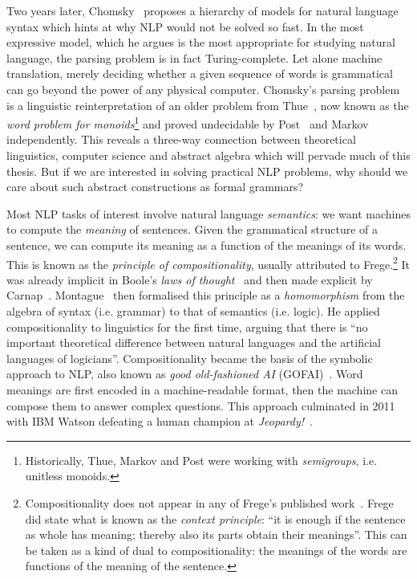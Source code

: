 Two years later, Chomsky~\cite{Chomsky56, Chomsky57} proposes a hierarchy of models for natural language syntax which hints at why NLP would not be solved so fast.
In the most expressive model, which he argues is the most appropriate for studying natural language, the parsing problem is in fact Turing-complete.
Let alone machine translation, merely deciding whether a given sequence of words is grammatical can go beyond the power of any physical computer.
Chomsky's parsing problem is a linguistic reinterpretation of an older problem from Thue~\cite{Thue14}, now known as the \emph{word problem for monoids}\footnote
{Historically, Thue, Markov and Post were working with \emph{semigroups}, i.e. unitless monoids.
} and proved undecidable by Post~\cite{Post47} and Markov~\cite{Markov47} independently.
This reveals a three-way connection between theoretical linguistics, computer science and abstract algebra which will pervade much of this thesis.
But if we are interested in solving practical NLP problems, why should we care about such abstract constructions as formal grammars?

Most NLP tasks of interest involve natural language \emph{semantics}: we want machines to compute the \emph{meaning} of sentences.
Given the grammatical structure of a sentence, we can compute its meaning as a function of the meanings of its words.
This is known as the \emph{principle of compositionality}, usually attributed to Frege.\footnote
{Compositionality does not appear in any of Frege's published work~\cite{Pelletier01}.
Frege did state what is known as the \emph{context principle}:
``it is enough if the sentence as whole has meaning; thereby also its parts obtain their meanings''.
This can be taken as a kind of dual to compositionality: the meanings of the words are functions of the meaning of the sentence.}
It was already implicit in Boole's \emph{laws of thought}~\cite{Boole54} and then made explicit by Carnap~\cite{Carnap47}.
Montague~\cite{Montague70,Montague70a,Montague73} then formalised this principle as a \emph{homomorphism} from the algebra of syntax (i.e. grammar) to that of semantics (i.e. logic).
He applied compositionality to linguistics for the first time, arguing that there is ``no important theoretical difference between natural languages and the artificial languages of logicians''.
Compositionality became the basis of the symbolic approach to NLP, also known as \emph{good old-fashioned AI} (GOFAI)~\cite{Haugeland89}.
Word meanings are first encoded in a machine-readable format, then the machine can compose them to answer complex questions.
This approach culminated in 2011 with IBM Watson defeating a human champion at \emph{Jeopardy!}~\cite{LallyFodor11}.

